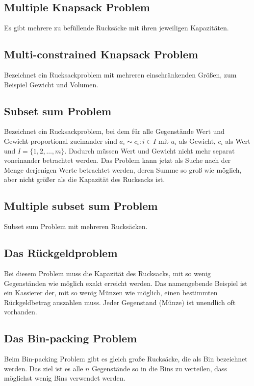 \documentclass[12pt, a4paper, ngerman]{article}
\begin{document}
\subsection{Multiple Knapsack Problem}

Es gibt mehrere zu befüllende Rucksäcke mit ihren jeweiligen Kapazitäten.

\subsection{Multi-constrained Knapsack Problem}

Bezeichnet ein Rucksackproblem mit mehreren einschränkenden Größen,
zum Beispiel Gewicht und Volumen.

\subsection{Subset sum Problem}

Bezeichnet ein Rucksackproblem,
bei dem für alle Gegenstände Wert und Gewicht proportional zueinander sind
\(a_i\sim c_i : i\in I\) mit \(a_i\) als Gewicht, \(c_i\) als Wert und \(I=\{1,2,\ldots,m\}\).
Dadurch müssen Wert und Gewicht nicht mehr separat voneinander betrachtet werden.
Das Problem kann jetzt als Suche nach der Menge derjenigen Werte betrachtet werden,
deren Summe so groß wie möglich,
aber nicht größer als die Kapazität des Rucksacks ist.

\subsection{Multiple subset sum Problem}

Subset sum Problem mit mehreren Rucksäcken.

\subsection{Das Rückgeldproblem}

Bei diesem Problem muss die Kapazität des Rucksacks,
mit so wenig Gegenständen wie möglich exakt erreicht werden.
Das namengebende Beispiel ist ein Kassierer der,
mit so wenig Münzen wie möglich,
einen bestimmten Rückgeldbetrag auszahlen muss.
Jeder Gegenstand (Münze) ist unendlich oft vorhanden.

\subsection{Das Bin-packing Problem} %
Beim Bin-packing Problem gibt es gleich große Rucksäcke,
die als Bin bezeichnet werden.
Das ziel ist es alle \(n\) Gegenstände so in die Bins zu verteilen,
dass möglichst wenig Bins verwendet werden.

\newpage
\printbibliography
\end{document}
